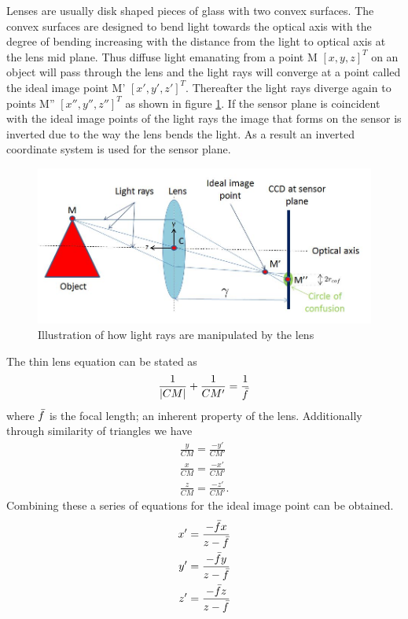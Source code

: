 Lenses are usually disk shaped pieces of glass with two convex surfaces. The convex surfaces are designed to bend light towards the optical axis with the degree of bending increasing with the distance from the light to optical axis at the lens mid plane. Thus diffuse light emanating from a point M $[x,y,z]^T$ on an object will pass through the lens and the light rays will converge at a point called the ideal image point M' $[x',y',z']^T$. Thereafter the light rays diverge again to points M'' $[x'', y'', z'']^T$ as shown in figure \ref{fig:optics}. If the sensor plane is coincident with the ideal image points of the light rays the image that forms on the sensor is inverted due to the way the lens bends the light. As a result an inverted coordinate system is used for the sensor plane.

\begin{figure}[h]
    \centering
    \includegraphics[scale=0.6]{Optics}
    \caption{Illustration of how light rays are manipulated by the lens}
    \label{fig:optics}
\end{figure}


The thin lens equation can be stated as
\begin{equation}
\frac{1}{|CM|} + \frac{1}{CM'} = \frac{1}{\bar{f}}
\end{equation}
where $\bar{f}$ is the focal length; an inherent property of the lens. Additionally through similarity of triangles we have
\begin{align}
\frac{y}{CM} = \frac{-y'}{CM'}\\
\frac{x}{CM} = \frac{-x'}{CM'}\\
\frac{z}{CM} = \frac{-z'}{CM'}.
\end{align}
Combining these a series of equations for the ideal image point can be obtained.
\begin{align}
\label{eq:optics y'2y}
\begin{split}
x'&=\frac{-\bar{f} x}{z - \bar{f}} \\
y'&=\frac{-\bar{f} y}{z - \bar{f}} \\
z'&=\frac{-\bar{f} z}{z - \bar{f}}
\end{split}
\end{align}

